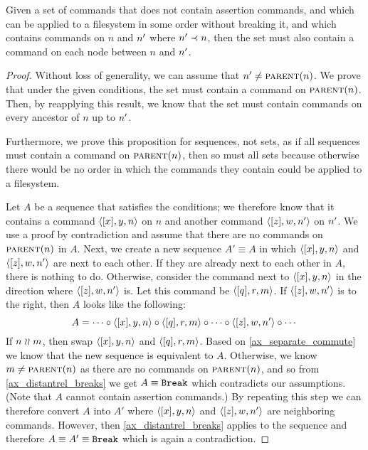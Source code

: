 \begin{mylem}\label{connected_changes}
Given a set of commands that
does not contain assertion commands,
and which can be applied to a filesystem in some order without breaking it,
and which contains commands on $n$ and $n'$ where $n'\prec n$,
then the set must also contain a command
on each node between $n$ and $n'$.
\end{mylem}
\begin{proof}
Without loss of generality, we can assume that $n'\neq\text{\normalfont\scshape{parent}}(n)$.
We prove that under the given conditions, the set must contain a command on $\text{\normalfont\scshape{parent}}(n)$.
Then, by reapplying this result, we know that the set must contain commands on every
ancestor of $n$ up to $n'$.

Furthermore,
we prove this proposition for sequences, not sets, as if all sequences must contain a command on $\text{\normalfont\scshape{parent}}(n)$,
then so must all sets because otherwise there would be no order in which the commands they contain could be
applied to a filesystem.

Let $A$ be a sequence that satisfies the conditions;
we therefore know that it contains a command $\langle{[x],y,n}\rangle$ on $n$
and another command $\langle{[z],w,n'}\rangle$ on $n'$.
We use a proof by contradiction and assume that there are no commands on $\text{\normalfont\scshape{parent}}(n)$ in $A$.
Next, we create a new sequence $A'\equiv A$ in which $\langle{[x],y,n}\rangle$ and $\langle{[z],w,n'}\rangle$ are next to each other.
If they are already next to each other in $A$, there is nothing to do.
Otherwise, consider the command next to $\langle{[x],y,n}\rangle$ in the direction where $\langle{[z],w,n'}\rangle$ is.
Let this command be $\langle{[q],r,m}\rangle$.
If $\langle{[z],w,n'}\rangle$ is to the right, then $A$ looks like the following:
\[ A = \cdots\circ\langle{[x],y,n}\rangle\circ\langle{[q],r,m}\rangle\circ\cdots\circ\langle{[z],w,n'}\rangle\circ\cdots \]
If $n\mathrel{\wr\wr} m$, then swap $\langle{[x],y,n}\rangle$ and $\langle{[q],r,m}\rangle$. Based on \cref{ax_separate_commute} we know that the new
sequence is equivalent to $A$.
Otherwise, we know $m\neq\text{\normalfont\scshape{parent}}(n)$ as there are no commands on $\text{\normalfont\scshape{parent}}(n)$, and so
from \cref{ax_distantrel_breaks} we get $A\equiv\mathtt{Break}$ which contradicts our assumptions.
(Note that $A$ cannot contain assertion commands.)
By repeating this step we can therefore convert $A$ into $A'$ where $\langle{[x],y,n}\rangle$ and $\langle{[z],w,n'}\rangle$ are neighboring commands.
However, then \cref{ax_distantrel_breaks} applies to the sequence and therefore $A\equiv A'\equiv\mathtt{Break}$ which
is again a contradiction.
\end{proof}



